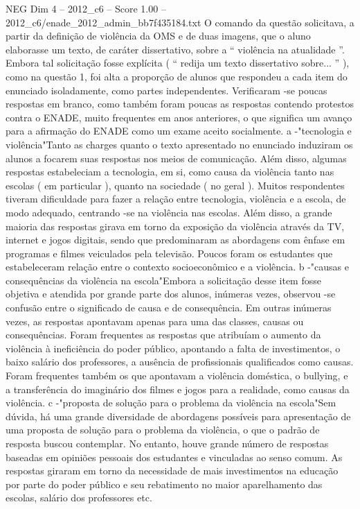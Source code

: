 \begin{textsample}{NEG Dim 4 – 2012\_c6 – Score 1.00 – 2012\_c6/enade\_2012\_admin\_bb7f435184.txt}
O comando da questão solicitava, a partir da definição de violência da OMS e de duas imagens, que o aluno elaborasse um texto, de caráter dissertativo, sobre a “ violência na atualidade ”.
Embora tal solicitação fosse explícita ( “ redija um texto dissertativo sobre... ” ), como na questão 1, foi alta a proporção de alunos que respondeu a cada item do enunciado isoladamente, como partes independentes.
Verificaram -se poucas respostas em branco, como também foram poucas as respostas contendo protestos contra o ENADE, muito frequentes em anos anteriores, o que significa um avanço para a afirmação do ENADE como um exame aceito socialmente. a -"tecnologia e violência"Tanto as charges quanto o texto apresentado no enunciado induziram os alunos a focarem suas respostas nos meios de comunicação.
Além disso, algumas respostas estabeleciam a tecnologia, em si, como causa da violência tanto nas escolas ( em particular ), quanto na sociedade ( no geral ).
Muitos respondentes tiveram dificuldade para fazer a relação entre tecnologia, violência e a escola, de modo adequado, centrando -se na violência nas escolas.
Além disso, a grande maioria das respostas girava em torno da exposição da violência através da TV, internet e jogos digitais, sendo que predominaram as abordagens com ênfase em programas e filmes veiculados pela televisão.
Poucos foram os estudantes que estabeleceram relação entre o contexto socioeconômico e a violência. b -"causas e consequências da violência na escola"Embora a solicitação desse item fosse objetiva e atendida por grande parte dos alunos, inúmeras vezes, observou -se confusão entre o significado de causa e de consequência.
Em outras inúmeras vezes, as respostas apontavam apenas para uma das classes, causas ou consequências.
Foram frequentes as respostas que atribuíam o aumento da violência à ineficiência do poder público, apontando a falta de investimentos, o baixo salário dos professores, a ausência de profissionais qualificados como causas.
Foram frequentes também os que apontavam a violência doméstica, o bullying, e a transferência do imaginário dos filmes e jogos para a realidade, como causas da violência. c -"proposta de solução para o problema da violência na escola"Sem dúvida, há uma grande diversidade de abordagens possíveis para apresentação de uma proposta de solução para o problema da violência, o que o padrão de resposta buscou contemplar.
No entanto, houve grande número de respostas baseadas em opiniões pessoais dos estudantes e vinculadas ao senso comum.
As respostas giraram em torno da necessidade de mais investimentos na educação por parte do poder público e seu rebatimento no maior aparelhamento das escolas, salário dos professores etc.

\end{textsample}
